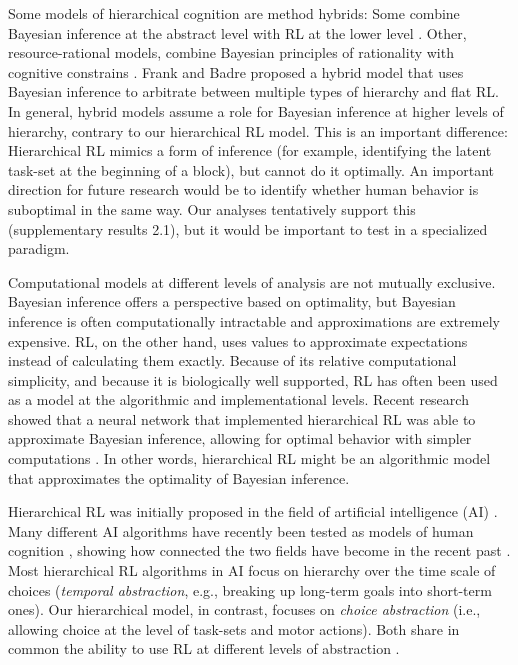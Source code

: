 \documentclass[10pt,letterpaper]{article}  %
\begin{document}
Some models of hierarchical cognition are method hybrids: Some combine Bayesian inference at the abstract level with RL at the lower level \cite{collins_reasoning_2012, frank_mechanisms_2012}. Other, resource-rational models, combine Bayesian principles of rationality with cognitive constrains \cite{lieder_resource-rational_2019}. Frank and Badre \cite{badre_mechanisms_2012, frank_mechanisms_2012} proposed a hybrid model that uses Bayesian inference to arbitrate between multiple types of hierarchy and flat RL. In general, hybrid models assume a role for Bayesian inference at higher levels of hierarchy, contrary to our hierarchical RL model. This is an important difference: Hierarchical RL mimics a form of inference (for example, identifying the latent task-set at the beginning of a block), but cannot do it optimally. An important direction for future research would be to identify whether human behavior is suboptimal in the same way. Our analyses tentatively support this (supplementary results 2.1), but it would be important to test in a specialized paradigm.

Computational models at different levels of analysis \cite{marr_vision:_1982} are not mutually exclusive. Bayesian inference offers a perspective based on optimality, but Bayesian inference is often computationally intractable and approximations are extremely expensive. RL, on the other hand, uses values to approximate expectations instead of calculating them exactly. Because of its relative computational simplicity, and because it is biologically well supported, RL has often been used as a model at the algorithmic and implementational levels. 
Recent research showed that a neural network that implemented hierarchical RL was able to approximate Bayesian inference, allowing for optimal behavior with simpler computations \cite{collins_cognitive_2013}. In other words, hierarchical RL might be an algorithmic model that approximates the optimality of Bayesian inference.

Hierarchical RL was initially proposed in the field of artificial intelligence (AI) \cite{vezhnevets_feudal_2017, konidaris_necessity_2019}. Many different AI algorithms have recently been tested as models of human cognition \cite{ribas_fernandes_neural_2011, ribas_fernandes_subgoal-and_2018, sutton_between_1999, momennejad_successor_2017, wang_prefrontal_2018}, showing how connected the two fields have become in the recent past \cite{sutton_reinforcement_2017, lake_building_2017, collins_reinforcement_2019}. 
Most hierarchical RL algorithms in AI focus on hierarchy over the time scale of choices (\textit{temporal abstraction}, e.g., breaking up long-term goals into short-term ones). Our hierarchical model, in contrast, focuses on \textit{choice abstraction} (i.e., allowing choice at the level of task-sets and motor actions). Both share in common the ability to use RL at different levels of abstraction \cite{ collins_reinforcement_2019}.
\end{document}
